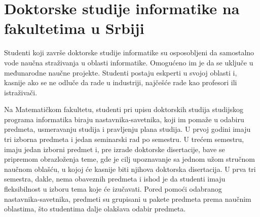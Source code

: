 \documentclass[a4paper]{article}
\begin{document}

\section{Doktorske studije informatike na fakultetima u Srbiji}
\label{sec:fakulteti}

Studenti koji završe doktorske studije informatike su osposobljeni da samostalno vode naučna straživanja u oblasti informatike. Omogućeno im je da se uključe u međunarodne naučne projekte. Studenti postaju eskperti u svojoj oblasti i, kasnije ako se ne odluče da rade u industriji, najčešće rade kao profesori ili istraživači.


Na Matematičkom fakultetu, studenti pri upisu doktorskih studija studijskog programa informatika biraju nastavnika-savetnika, koji im pomaže u odabiru predmeta, usmeravanju studija i pravljenju plana studija. U prvoj godini imaju tri izborna predmeta i jedan seminarski rad po semestru. U trećem semestru, imaju jedan izborni predmet i, pre izrade doktorske disertacije, bave se pripremom obrazloženja teme, gde je cilj upoznavanje sa jednom užom stručnom naučnom oblašću, u kojoj će kasnije biti njihova doktorska disertacija. U prva tri semestra, dakle, nema obaveznih predmeta i ishod je da studenti imaju fleksibilnost u izboru tema koje će izučavati. Pored pomoći odabranog nastavnika-savetnika, predmeti su grupisani u pakete predmeta prema naučnim oblastima, što studentima dalje olakšava odabir predmeta.
\end{document}
